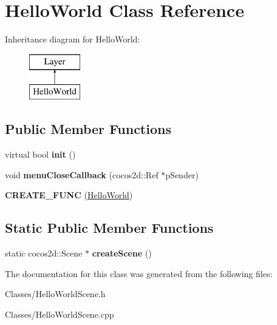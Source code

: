\hypertarget{class_hello_world}{}\section{Hello\+World Class Reference}
\label{class_hello_world}
Inheritance diagram for Hello\+World\+:\begin{figure}[H]
\begin{center}
\leavevmode
\includegraphics[height=2.000000cm]{class_hello_world}
\end{center}
\end{figure}
\subsection*{Public Member Functions}
\begin{DoxyCompactItemize}
\item 
virtual bool {\bfseries init} ()\hypertarget{class_hello_world_a65e2b1525051f3690e5a39ca56608a97}{}\label{class_hello_world_a65e2b1525051f3690e5a39ca56608a97}

\item 
void {\bfseries menu\+Close\+Callback} (cocos2d\+::\+Ref $\ast$p\+Sender)\hypertarget{class_hello_world_ac4ab2f5e922e659d4f137591c0f6a9b0}{}\label{class_hello_world_ac4ab2f5e922e659d4f137591c0f6a9b0}

\item 
{\bfseries C\+R\+E\+A\+T\+E\+\_\+\+F\+U\+NC} (\hyperlink{class_hello_world}{Hello\+World})\hypertarget{class_hello_world_a857ebfbc49f3a7f81772bee4991d186b}{}\label{class_hello_world_a857ebfbc49f3a7f81772bee4991d186b}

\end{DoxyCompactItemize}
\subsection*{Static Public Member Functions}
\begin{DoxyCompactItemize}
\item 
static cocos2d\+::\+Scene $\ast$ {\bfseries create\+Scene} ()\hypertarget{class_hello_world_a1b700f5f9de04271533d3fa099d7b014}{}\label{class_hello_world_a1b700f5f9de04271533d3fa099d7b014}

\end{DoxyCompactItemize}


The documentation for this class was generated from the following files\+:\begin{DoxyCompactItemize}
\item 
Classes/Hello\+World\+Scene.\+h\item 
Classes/Hello\+World\+Scene.\+cpp\end{DoxyCompactItemize}
